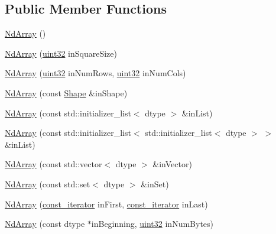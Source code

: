 \subsection*{Public Member Functions}
\begin{DoxyCompactItemize}
\item 
\mbox{\hyperlink{class_num_cpp_1_1_nd_array_a77687fd6deacb19d577dfc7cc8dbef52}{Nd\+Array}} ()
\item 
\mbox{\hyperlink{class_num_cpp_1_1_nd_array_aa1b7e379179f2dd68342dbde5e2540e4}{Nd\+Array}} (\mbox{\hyperlink{namespace_num_cpp_a36f388e948380413c63011cab9b7fbd5}{uint32}} in\+Square\+Size)
\item 
\mbox{\hyperlink{class_num_cpp_1_1_nd_array_a7f12eb75e8436564c1f273f6236395db}{Nd\+Array}} (\mbox{\hyperlink{namespace_num_cpp_a36f388e948380413c63011cab9b7fbd5}{uint32}} in\+Num\+Rows, \mbox{\hyperlink{namespace_num_cpp_a36f388e948380413c63011cab9b7fbd5}{uint32}} in\+Num\+Cols)
\item 
\mbox{\hyperlink{class_num_cpp_1_1_nd_array_a191657f4184d31a931678ef8e0b54387}{Nd\+Array}} (const \mbox{\hyperlink{class_num_cpp_1_1_shape}{Shape}} \&in\+Shape)
\item 
\mbox{\hyperlink{class_num_cpp_1_1_nd_array_a71fdbc36c3eaee08493eb63ee58690d2}{Nd\+Array}} (const std\+::initializer\+\_\+list$<$ dtype $>$ \&in\+List)
\item 
\mbox{\hyperlink{class_num_cpp_1_1_nd_array_ad70efcdefcd50d8189f425a0e2b6abcd}{Nd\+Array}} (const std\+::initializer\+\_\+list$<$ std\+::initializer\+\_\+list$<$ dtype $>$ $>$ \&in\+List)
\item 
\mbox{\hyperlink{class_num_cpp_1_1_nd_array_aa10a04577f13894e5e4b5154cf7a278f}{Nd\+Array}} (const std\+::vector$<$ dtype $>$ \&in\+Vector)
\item 
\mbox{\hyperlink{class_num_cpp_1_1_nd_array_ae0c5a43e4a6eb936dbfe9a11cdf65e65}{Nd\+Array}} (const std\+::set$<$ dtype $>$ \&in\+Set)
\item 
\mbox{\hyperlink{class_num_cpp_1_1_nd_array_a1e3ccf914358a4f85f06f8307265ece0}{Nd\+Array}} (\mbox{\hyperlink{class_num_cpp_1_1_nd_array_a770eaf3b67efaa19e310ed14eee5aabb}{const\+\_\+iterator}} in\+First, \mbox{\hyperlink{class_num_cpp_1_1_nd_array_a770eaf3b67efaa19e310ed14eee5aabb}{const\+\_\+iterator}} in\+Last)
\item 
\mbox{\hyperlink{class_num_cpp_1_1_nd_array_a57fdb3909ce62c7924ffe355a30bf420}{Nd\+Array}} (const dtype $\ast$in\+Beginning, \mbox{\hyperlink{namespace_num_cpp_a36f388e948380413c63011cab9b7fbd5}{uint32}} in\+Num\+Bytes)

\end{DoxyCompactItemize}
